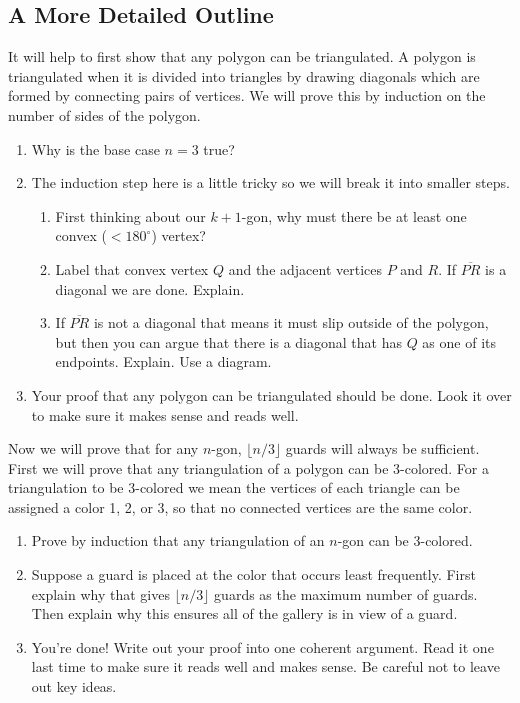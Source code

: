 \documentclass{amsbook}
\begin{document}
\subsection*{A More Detailed Outline}
It will help to first show that any polygon can be triangulated. A polygon is triangulated when it is divided into triangles by drawing diagonals which are formed by connecting pairs of vertices. We will prove this by induction on the number of sides of the polygon.
	\begin{enumerate}
		\item Why is the base case $n=3$ true?
		\item The induction step here is a little tricky so we will break it into smaller steps.
			\begin{enumerate}
				\item First thinking about our $k+1$-gon, why must there be at least one convex ($<180^\circ$) vertex? 
				\item Label that convex vertex $Q$ and the adjacent vertices $P$ and $R$. If $\overline{PR}$ is a diagonal we are done. Explain.
				\item If $\overline{PR}$ is not a diagonal that means it must slip outside of the polygon, but then you can argue that there is a diagonal that has $Q$ as one of its endpoints. Explain. Use a diagram.
				
			\end{enumerate}
		\item Your proof that any polygon can be triangulated should be done. Look it over to make sure it makes sense and reads well.
	\end{enumerate}
	\vspace{1cm}
Now we will prove that for any $n$-gon, $\lfloor n/3 \rfloor$ guards will always be sufficient. First we will prove that any triangulation of a polygon can be 3-colored. For a triangulation to be 3-colored we mean the vertices of each triangle can be assigned a color 1, 2, or 3, so that no connected vertices are the same color.
\begin{enumerate}
	\item Prove by induction that any triangulation of an $n$-gon can be 3-colored.
	\item Suppose a guard is placed at the color that occurs least frequently. First explain why that gives $\lfloor n/3 \rfloor$ guards as the maximum number of guards. Then explain why this ensures all of the gallery is in view of a guard. 
	\item You're done! Write out your proof into one coherent argument. Read it one last time to make sure it reads well and makes sense. Be careful not to leave out key ideas.
\end{enumerate}
\newpage	    
\end{document}
